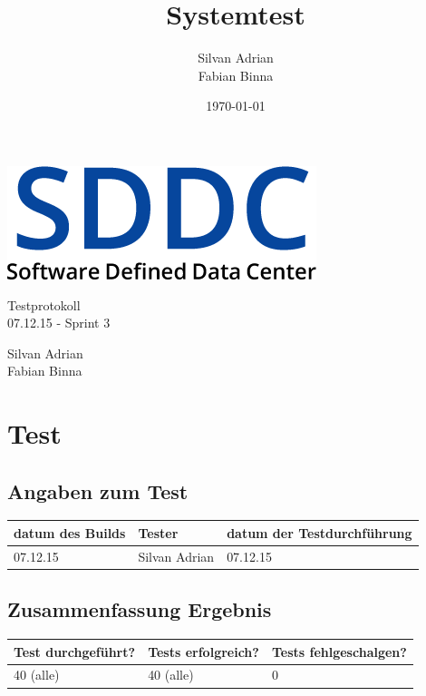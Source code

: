 \documentclass[11pt]{scrartcl}
\title{Systemtest}
\author{Silvan Adrian \\ Fabian Binna}
\date{\today{}}
\begin{document}
\def\arraystretch{1.5}
\begin{titlepage}
\begin{center}
\vspace{10em}
\includegraphics[scale=2]{SDDC}
\vspace{10em}
\end{center}
\begin{center}
\huge {Testprotokoll}\\
\huge {07.12.15 - Sprint 3}\\
\end{center}
\begin{center}
\vspace{10em}
\LARGE {Silvan Adrian} \\
\LARGE {Fabian Binna}
\end{center}

\end{titlepage}


\newpage
\tableofcontents
\newpage

\section{Test}
\subsection{Angaben zum Test}

\begin{tabularx}{\linewidth}{l l l}
\textbf{datum des Builds} & \textbf{Tester} & \textbf{datum der Testdurchführung}\\
\hline
07.12.15 & Silvan Adrian & 07.12.15

\end{tabularx}

\subsection{Zusammenfassung Ergebnis}
\begin{tabularx}{\linewidth}{l l l}
\textbf{Test durchgeführt?} & \textbf{Tests erfolgreich?} & \textbf{Tests fehlgeschalgen?}\\
\hline
40 (alle) & 40 (alle) & 0 \\
\hline
\end{tabularx}
\end{document}
